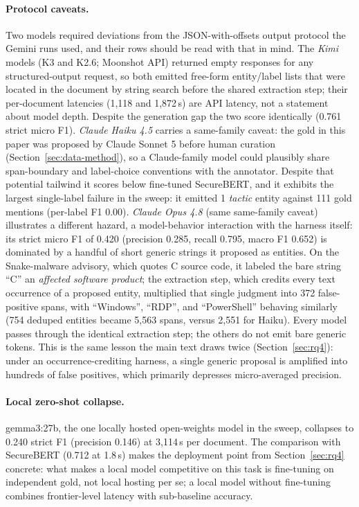\documentclass[11pt]{article}
\begin{document}
\paragraph{Protocol caveats.} Two models required deviations from the
JSON-with-offsets output protocol the Gemini runs used, and their rows
should be read with that in mind. The \emph{Kimi} models (K3 and K2.6; Moonshot API) returned
empty responses for any structured-output request, so both emitted
free-form entity/label lists that were located in the document by string
search before the shared extraction step; their per-document latencies
(1{,}118 and 1{,}872\,s) are API latency, not a statement about model
depth. Despite the generation gap the two score identically (0.761
strict micro F1). \emph{Claude Haiku 4.5}
carries a same-family caveat: the gold in this paper was proposed by
Claude Sonnet 5 before human curation (Section~\ref{sec:data-method}), so a
Claude-family model could plausibly share span-boundary and label-choice
conventions with the annotator. Despite that potential tailwind it scores
below fine-tuned SecureBERT, and it exhibits the largest single-label
failure in the sweep: it emitted 1 \emph{tactic} entity against 111 gold
mentions (per-label F1 0.00). \emph{Claude Opus 4.8} (same same-family
caveat) illustrates a different hazard, a model-behavior interaction with
the harness itself: its strict micro F1 of 0.420 (precision 0.285, recall
0.795, macro F1 0.652) is dominated by a handful of short generic strings
it proposed as entities. On the Snake-malware advisory, which quotes C
source code, it labeled the bare string ``C'' an \emph{affected software
product}; the extraction step, which credits every text occurrence of a
proposed entity, multiplied that single judgment into 372 false-positive
spans, with ``Windows'', ``RDP'', and ``PowerShell'' behaving similarly
(754 deduped entities became 5{,}563 spans, versus 2{,}551 for Haiku).
Every model passes through the identical extraction step; the others
do not emit bare generic tokens. This is the same lesson the
main text draws twice (Section~\ref{sec:rq4}): under an
occurrence-crediting harness, a single generic proposal is amplified
into hundreds of false positives, which primarily depresses
micro-averaged precision.

\paragraph{Local zero-shot collapse.} gemma3:27b, the one locally hosted
open-weights model in the sweep, collapses to 0.240 strict F1 (precision
0.146) at 3{,}114\,s per document. The comparison with SecureBERT
(0.712 at 1.8\,s) makes the deployment point from
Section~\ref{sec:rq4} concrete: what makes a local model competitive on
this task is fine-tuning on independent gold, not local hosting per se; a
local model without fine-tuning combines frontier-level latency with
sub-baseline accuracy.
\end{document}
